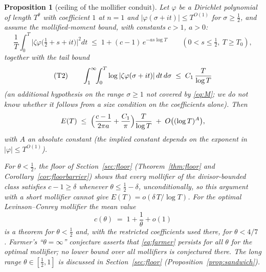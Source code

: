 \documentclass[11pt]{amsart}
\theoremstyle{plain}
\newtheorem{proposition}[theorem]{Proposition}
\theoremstyle{definition}
\theoremstyle{remark}
\begin{document}
\begin{proposition}[ceiling of the mollifier conduit]\label{prop:mollifier}
Let $\varphi$ be a Dirichlet polynomial of length $T^\theta$ with coefficient $1$ at $n=1$ and $|\varphi(\sigma+it)|\le T^{O(1)}$ for $\sigma\ge\tfrac12$, and assume the mollified-moment bound, with constants $c>1$, $a>0$:
\begin{equation}\label{eq:M}
\frac1T\int_0^T\bigl|\zeta\varphi\bigl(\tfrac12+s+it\bigr)\bigr|^2dt\;\le\;1+(c-1)\,e^{-as\log T}
\qquad(0<s\le\tfrac12,\ T\ge T_0),
\end{equation}
together with the tail bound
\[
\textup{(T2)}\qquad \int_1^\infty\!\!\int_0^T\log|\zeta\varphi(\sigma+it)|\,dt\,d\sigma\;\le\;C_1\,\frac{T}{\log T}
\]
\textup{(}an additional hypothesis on the range $\sigma\ge1$ not covered by \eqref{eq:M}; we do not know whether it follows from a size condition on the coefficients alone\textup{)}. Then
\[
E(T)\;\le\;\Bigl(\frac{c-1}{2\pi a}+\frac{C_1}{\pi}\Bigr)\frac{T}{\log T}\;+\;O\bigl((\log T)^{A}\bigr),
\]
with $A$ an absolute constant (the implied constant depends on the exponent in $|\varphi|\le T^{O(1)}$).

For $\theta<\tfrac12$, the floor of Section~\ref{sec:floor} \textup{(}Theorem~\ref{thm:floor} and Corollary~\ref{cor:floorbarrier}\textup{)} shows that every mollifier of the divisor-bounded class satisfies $c-1\ge\delta$ whenever $\theta\le\tfrac12-\delta$, unconditionally, so this argument with a short mollifier cannot give $E(T)=o(\delta\,T/\log T)$. For the optimal Levinson--Conrey mollifier the mean value
\begin{equation}\label{eq:farmer}
c(\theta)\;=\;1+\frac1\theta+o(1)
\end{equation}
is a theorem for $\theta<\tfrac12$ \cite{BCHB1985} and, with the restricted coefficients used there, for $\theta<4/7$ \cite{Conrey1989}. Farmer's ``$\theta=\infty$'' conjecture \cite{Farmer1993,BettinGonek2017} asserts that \eqref{eq:farmer} persists for all $\theta$ for the optimal mollifier; no lower bound over all mollifiers is conjectured there. The long range $\theta\in[\tfrac12,1]$ is discussed in Section~\ref{sec:floor} \textup{(}Proposition~\ref{prop:sandwich}\textup{)}.
\end{proposition}
\end{document}
